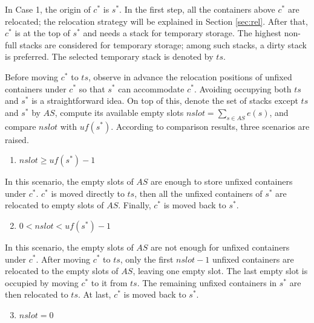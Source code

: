 \documentclass[review,3p,times,authoryear,12pt]{elsarticle}
\begin{document}
In Case 1, the origin of $c^*$ is $s^*$.
In the first step, all the containers above $c^*$ are relocated; the relocation strategy will be explained in Section \ref{sec:rel}.
After that, $c^*$ is at the top of $s^*$ and needs a stack for temporary storage.
The highest non-full stacks are considered for temporary storage; among such stacks, a dirty stack is preferred. The selected temporary stack is denoted by $\mathit{ts}$.

Before moving $c^*$ to $\mathit{ts}$, observe in advance the relocation positions of unfixed containers under $c^*$ so that $s^*$ can accommodate $c^*$.
Avoiding occupying both $\mathit{ts}$ and $s^*$ is a straightforward idea.
On top of this, denote the set of stacks except $\mathit{ts}$ and $s^*$ by $\mathit{AS}$, compute its available empty slots $\mathit{nslot} = \sum_{s\in \mathit{AS}}e(s)$, and compare $\mathit{nslot}$ with $\mathit{uf}(s^*)$.
According to comparison results, three scenarios are raised.

\begin{enumerate}
\setcounter{enumi}{0}
\item $\mathit{nslot}\ge \mathit{uf}(s^*)-1$
\end{enumerate}

In this scenario, the empty slots of $\mathit{AS}$ are enough to store unfixed containers under $c^*$. $c^*$ is moved directly to $\mathit{ts}$, then all the unfixed containers of $s^*$ are relocated to empty slots of $\mathit{AS}$.
Finally, $c^*$ is moved back to $s^*$.

\begin{enumerate}
\setcounter{enumi}{1}
\item $0<\mathit{nslot}< \mathit{uf}(s^*)-1$
\end{enumerate}

In this scenario, the empty slots of $\mathit{AS}$ are not enough for unfixed containers under $c^*$. After moving $c^*$ to $\mathit{ts}$, only the first $\mathit{nslot}-1$ unfixed containers are relocated to the empty slots of $\mathit{AS}$, leaving one empty slot.
The last empty slot is occupied by moving $c^*$ to it from $\mathit{ts}$.
The remaining unfixed containers in $s^*$ are then relocated to $\mathit{ts}$.
At last, $c^*$ is moved back to $s^*$.

\begin{enumerate}
\setcounter{enumi}{2}
\item $\mathit{nslot}=0$
\end{enumerate}
\end{document}
